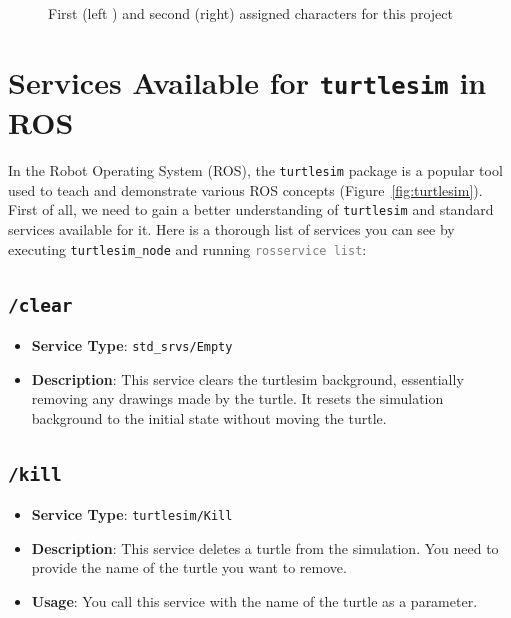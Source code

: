 \documentclass[conference]{IEEEtran}
\newcommand{\command}[1]{\textcolor{gray}{\footnotesize \texttt{#1}}}
\begin{document}
\begin{figure}[htbp]
    \centering
     \hfill
    \caption{First (left \cite{b5}) and second (right) assigned characters for this project}
    \label{fig:chars}
\end{figure}

\section*{Services Available for \texttt{turtlesim} in ROS}
In the Robot Operating System (ROS), the \texttt{turtlesim} package is a popular tool used to teach and demonstrate various ROS concepts (Figure~\ref{fig:turtlesim}). First of all, we need to gain a better understanding of \texttt{turtlesim} and standard services available for it. Here is a thorough list of services you can see by executing \texttt{turtlesim\_node} and running \command{rosservice list}:

\subsection{\texttt{/clear}}
\begin{itemize}
    \item \textbf{Service Type}: \texttt{std\_srvs/Empty}
    \item \textbf{Description}: This service clears the turtlesim background, essentially removing any drawings made by the turtle. It resets the simulation background to the initial state without moving the turtle.
\end{itemize}

\subsection{\texttt{/kill}}
\begin{itemize}
    \item \textbf{Service Type}: \texttt{turtlesim/Kill}
    \item \textbf{Description}: This service deletes a turtle from the simulation. You need to provide the name of the turtle you want to remove.
    \item \textbf{Usage}: You call this service with the name of the turtle as a parameter.
\end{itemize}
\end{document}
